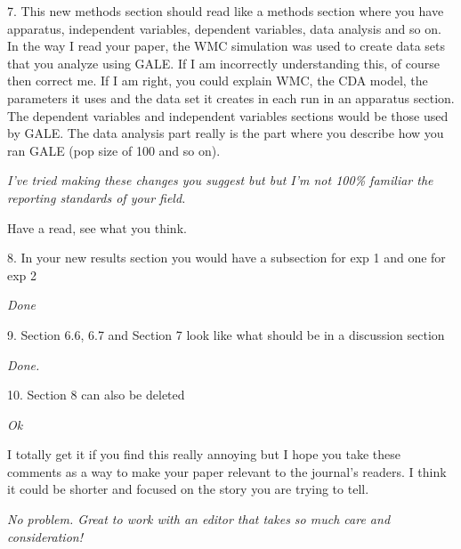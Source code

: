 \documentclass[journal]{IEEEtran}
\begin{document}
7.      This new methods section should read like a methods section where you have apparatus, independent variables, dependent variables, data analysis and so on. In the way I read your paper, the WMC simulation was used to create data sets that you analyze using GALE. If I am incorrectly understanding this, of course then correct me. If I am right, you could explain WMC, the CDA model, the parameters it uses and the data set it creates in each run in an apparatus section. The dependent variables and independent variables sections would be those used by GALE. The data analysis part really  is the part where you describe how you ran GALE (pop size of 100 and so on).


{\em I've tried  making  these changes you suggest but but I'm not 100\% familiar 
the reporting standards of your field.

Have a read, see what you think.
}

8.      In your new results section you would have a subsection for exp 1 and one for exp 2

{\em Done}

9.      Section 6.6, 6.7 and Section 7 look like what should be in a discussion section

{\em Done.}

10.  Section 8 can also be deleted

{\em Ok}

I totally get it if you find this really annoying
but I hope you take these comments as a way to make
your paper relevant to the journal’s readers. I
think it could be shorter and focused on the story
you are trying to tell.

{\em No problem. Great to work with an editor that takes so much care and consideration!}


\end{document}
